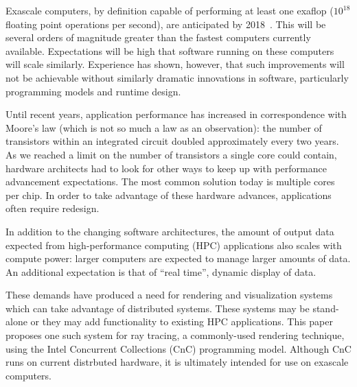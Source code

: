 
Exascale computers, by definition capable of performing at least one
exaflop ($10^{18}$ floating point operations per second), are
anticipated by 2018~\cite{kogge2013exascale}.
This will be several orders of magnitude greater than the fastest computers
currently available. Expectations will be high that software running on these computers will scale similarly.
Experience has shown, however, that such improvements will not be
achievable without similarly dramatic innovations in software,
particularly programming models and runtime design.

Until recent years, application performance has increased in
correspondence with Moore's law (which is not so much a law as an
observation): the number of transistors within an integrated circuit
doubled approximately every two years. As we reached a limit on the
number of transistors a single core could contain, hardware architects
had to look for other ways to keep up with performance advancement
expectations. The most common solution today is multiple cores per
chip. In order to take advantage of these hardware advances,
applications often require redesign.

In addition to the changing software architectures, the amount of
output data expected from high-performance computing (HPC)
applications also scales with compute power: larger computers are
expected to manage larger amounts of data. An additional expectation
is that of ``real time'', dynamic display of data.

These demands have produced a need for rendering and visualization
systems which can take advantage of distributed systems. These systems
may be stand-alone or they may add functionality to existing HPC
applications. This paper proposes one such system for ray tracing, a
commonly-used rendering technique, using the Intel Concurrent
Collections (CnC) programming model. Although CnC runs on current
distrbuted hardware, it is ultimately intended for use on exascale
computers.


